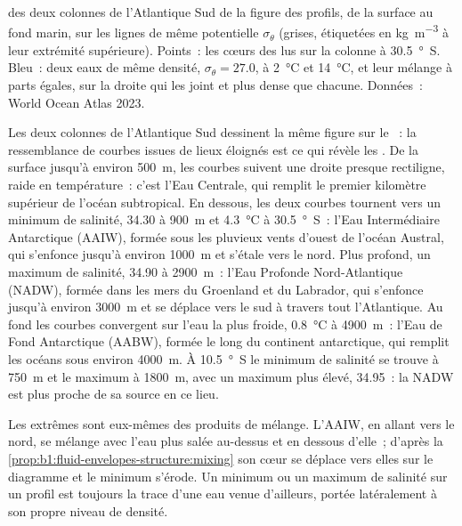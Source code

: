 \begin{omfigure}
{\small {} des deux colonnes de l'Atlantique Sud de la figure des profils,
de la surface au fond marin, sur les lignes de même  potentielle
$\sigma_\theta$ (grises, étiquetées en \si{kg.m^{-3}} à leur extrémité supérieure).
Points~: les cœurs des  lus sur la colonne à \qty{30.5}{\degree
S}. Bleu~: deux eaux de même densité, $\sigma_\theta = 27.0$, à
\qty{2}{\celsius} et \qty{14}{\celsius}, et leur mélange à parts égales, sur la
droite qui les joint et plus dense que chacune. Données~: World Ocean Atlas
2023.}
\label{fig:b1:fluid-envelopes-structure:ts}
\end{omfigure}

Les deux colonnes de l'Atlantique Sud dessinent la même figure sur le ~: la
ressemblance de courbes issues de lieux éloignés est ce qui révèle les . De
la surface jusqu'à environ \qty{500}{m}, les courbes suivent une droite presque
rectiligne, raide en température~: c'est l'Eau Centrale, qui remplit le premier
kilomètre supérieur de l'océan subtropical. En dessous, les deux courbes tournent vers un minimum
de salinité, \num{34.30} à \qty{900}{m} et \qty{4.3}{\celsius} à
\qty{30.5}{\degree S}~: l'Eau Intermédiaire Antarctique (AAIW), formée sous les
pluvieux vents d'ouest de l'océan Austral, qui s'enfonce jusqu'à environ \qty{1000}{m} et
s'étale vers le nord. Plus profond, un maximum de salinité, \num{34.90} à \qty{2900}{m}~: l'Eau
Profonde Nord-Atlantique (NADW), formée dans les mers du Groenland et du Labrador, qui s'enfonce jusqu'à
environ \qty{3000}{m} et se déplace vers le sud à travers tout l'Atlantique. Au fond
les courbes convergent sur l'eau la plus froide, \qty{0.8}{\celsius} à
\qty{4900}{m}~: l'Eau de Fond Antarctique (AABW), formée le long du continent
antarctique, qui remplit les océans sous environ \qty{4000}{m}. À
\qty{10.5}{\degree S} le minimum de salinité se trouve à \qty{750}{m} et le maximum
à \qty{1800}{m}, avec un maximum plus élevé, \num{34.95}~: la NADW est plus proche de sa
source en ce lieu.

Les extrêmes sont eux-mêmes des produits de mélange. L'AAIW, en allant vers le nord, se mélange
avec l'eau plus salée au-dessus et en dessous d'elle~; d'après la \cref{prop:b1:fluid-envelopes-structure:mixing}
son cœur se déplace vers elles sur le diagramme et le minimum s'érode. Un minimum
ou un maximum de salinité sur un profil est toujours la trace d'une eau venue
d'ailleurs, portée latéralement à son propre niveau de densité.

